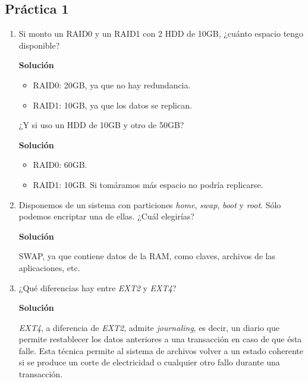 \documentclass[12pt,spanish]{article}
\newenvironment{solution}{
	\par
	\textbf{Solución}
	\par
	\begin{center}
}
{
	\end{center}
}
\begin{document}
\subsection{Práctica 1}
\begin{enumerate}
  \item Si monto un RAID0 y un RAID1 con 2 HDD de 10GB, ¿cuánto espacio tengo disponible?
  \begin{solution}
    \begin{itemize}
      \item RAID0: 20GB, ya que no hay redundancia.
      \item RAID1: 10GB, ya que los datos se replican.
    \end{itemize}
  \end{solution}
  ¿Y si uso un HDD de 10GB y otro de 50GB?
  \begin{solution}
    \begin{itemize}
      \item RAID0: 60GB.
      \item RAID1: 10GB. Si tomáramos más espacio no podría replicarse.
    \end{itemize}
  \end{solution}
  \item Disponemos de un sistema con particiones \textit{home}, \textit{swap}, \textit{boot} y \textit{root}. Sólo podemos encriptar una de ellas. ¿Cuál elegirías?
  \begin{solution}
    SWAP, ya que contiene datos de la RAM, como claves, archivos de las aplicaciones, etc.
  \end{solution}
	\item ¿Qué diferencias hay entre \textit{EXT2} y \textit{EXT4}?
	\begin{solution}
		\textit{EXT4}, a diferencia de \textit{EXT2}, admite \textit{journaling}, es decir, un diario que permite restablecer los datos anteriores a una transacción en caso de que ésta falle. Esta técnica permite al sistema de archivos volver a un estado coherente si se produce un corte de electricidad o cualquier otro fallo durante una transacción.
	\end{solution}
\end{enumerate}
\end{document}
